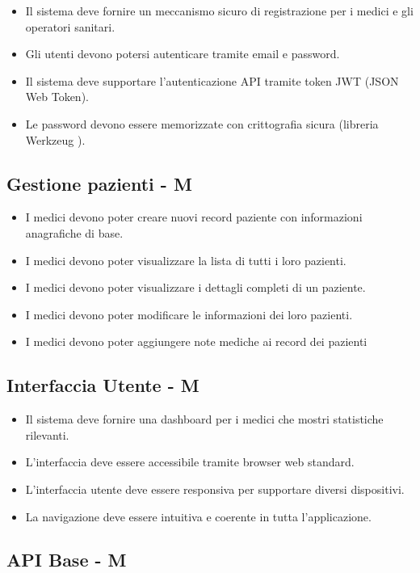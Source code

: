 \documentclass[12pt,a4paper,oneside]{report}
\begin{document}
\begin{itemize}
    \item Il sistema deve fornire un meccanismo sicuro di registrazione per i medici e gli operatori sanitari.
    \item Gli utenti devono potersi autenticare tramite email e password.
  \item Il sistema deve supportare l'autenticazione API tramite token JWT (JSON Web Token).
    \item Le password devono essere memorizzate con crittografia sicura (libreria Werkzeug \cite{werkzeug}).
\end{itemize}

\subsection{Gestione pazienti - M}

\begin{itemize}
    \item I medici devono poter creare nuovi record paziente con informazioni anagrafiche di base.
    \item I medici devono poter visualizzare la lista di tutti i loro pazienti.
    \item I medici devono poter visualizzare i dettagli completi di un paziente.
    \item I medici devono poter modificare le informazioni dei loro pazienti.
    \item I medici devono poter aggiungere note mediche ai record dei pazienti
\end{itemize}

\subsection{Interfaccia Utente - M}

\begin{itemize}
    \item Il sistema deve fornire una dashboard per i medici che mostri statistiche rilevanti.
    \item L'interfaccia deve essere accessibile tramite browser web standard.
    \item L'interfaccia utente deve essere responsiva per supportare diversi dispositivi.
    \item La navigazione deve essere intuitiva e coerente in tutta l'applicazione.
\end{itemize}

\subsection{API Base - M}
\end{document}
